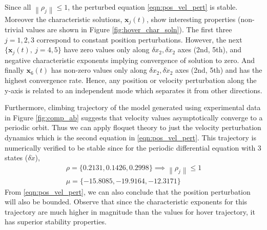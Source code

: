 \documentclass[10pt]{article}
\newcommand{\norm}[1]{\ensuremath{\left\| #1 \right\|}}
\begin{document}
Since all $ \norm{\rho_j} \le 1 $, the perturbed equation \ref{eqn:pos_vel_pert} is stable. Moreover the characteristic solutions, $ \mathbf{x}_j(t) $, show interesting properties (non-trivial values are shown in Figure \ref{fig:hover_char_soln}). The first three $ j = {1, 2, 3} $ correspond to constant position perturbations. However, the next $ \lbrace \mathbf{x}_j(t),\ j = {4, 5} \rbrace $ have zero values only along $ \delta x_2, \delta \dot{x}_2 $ axes (2nd, 5th), and negative characteristic exponents implying convergence of solution to zero. And finally $ \mathbf{x}_6(t) $ has non-zero values only along $ \delta x_2, \delta \dot{x}_2 $ axes (2nd, 5th) and has the highest convergence rate. Hence, any position or velocity perturbation along the y-axis is related to an independent mode which separates it from other directions.

Furthermore, climbing trajectory of the model generated using experimental data in Figure \ref{fig:comp_ab} suggests that velocity values asymptotically converge to a periodic orbit. Thus we can apply floquet theory to just the velocity perturbation dynamics which is the second equation in \eqref{eqn:pos_vel_pert}. This trajectory is numerically verified to be stable since for the periodic differential equation with 3 states ($ \delta \dot x $),
\begin{gather*}
\rho = \lbrace 0.2131, 0.1426, 0.2998 \rbrace \implies \norm{\rho_j} \le 1\\
\mu = \lbrace -15.8085, -19.9164, -12.3171 \rbrace
\end{gather*}
From \eqref{eqn:pos_vel_pert}, we can also conclude that the position perturbation will also be bounded. Observe that since the characteristic exponents for this trajectory are much higher in magnitude than the values for hover trajectory, it has superior stability properties.

\end{document}
